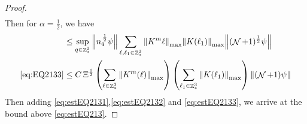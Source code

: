\documentclass[sn-mathphys, Numbered ,a4paper]{sn-jnl}%
\DeclareMathOperator{\Z}{\mathbb{Z}}
\DeclareMathOperator{\NN}{\mathcal{N}}
\newcommand{\half}{\frac{1}{2}}
\theoremstyle{plain}
\theoremstyle{definition}
\theoremstyle{remark}
\theoremstyle{plain}
\theoremstyle{definition}
\theoremstyle{remark}
\begin{document}
\begin{proof}
\begin{align}
\end{align} 
Then for $\alpha = \half$, we have
\begin{align}
	&\leq  \sup\limits_{q \in \Z^3_*} \norm{ n_{q}^{\,\half} \psi } \sum\limits_{\ell, \ell_1\in \Z^3_*}  \norm{K^m{\ell}}_{\mathrm{max}} \norm{K(\ell_1)}_{\mathrm{max}} \norm{ (\NN+1)^{\frac{1}{2}} \psi}  \nonumber\\
	\eqref{eq:EQ2133}&\leq C\, \Xi^\half \left(\sum\limits_{\ell\in \Z^3_*} \norm{K^m(\ell)}_{\mathrm{max}}\right)\left(  \sum\limits_{ \ell_1\in \Z^3_*}  \norm{ K(\ell_1)}_{\mathrm{max}} \right) \norm{ (\NN+1) \psi}\label{eq:estEQ2133} 
\end{align}
Then adding \eqref{eq:estEQ2131},\eqref{eq:estEQ2132} and \eqref{eq:estEQ2133}, we arrive at the bound above \eqref{eq:estEQ213}.
\end{proof}
\end{document}
